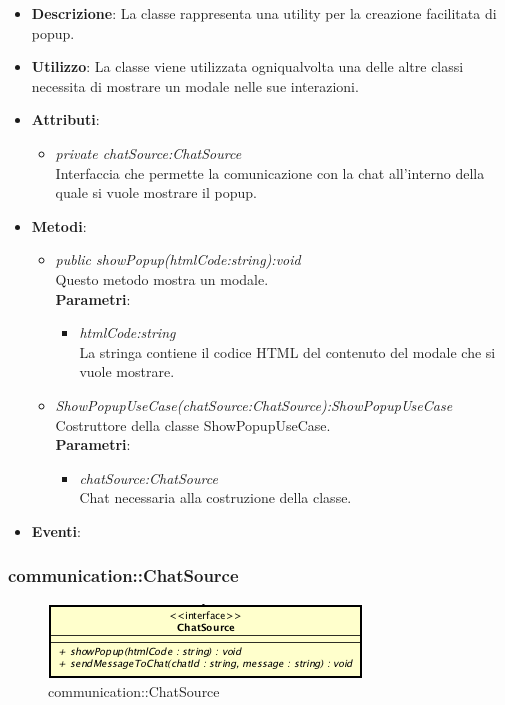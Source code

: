 \begin{itemize}
\item \textbf{Descrizione}: La classe rappresenta una utility per la creazione facilitata di popup.
\item \textbf{Utilizzo}: La classe viene utilizzata ogniqualvolta una delle altre classi necessita di mostrare un modale nelle sue interazioni.
\item \textbf{Attributi}: 
	\begin{itemize}
	\item \textit{private chatSource:ChatSource}\\
	Interfaccia che permette la comunicazione con la chat all'interno della quale si vuole mostrare il popup.
	\end{itemize}
\item \textbf{Metodi}:
	\begin{itemize}
	\item \textit{public showPopup(htmlCode:string):void}\\
	Questo metodo mostra un modale.
			\\ \textbf{Parametri}: \begin{itemize}
			\item \textit{htmlCode:string}\\
			La stringa contiene il codice HTML del contenuto del modale che si vuole mostrare.
			\end{itemize} 
	\item \textit{ShowPopupUseCase(chatSource:ChatSource):ShowPopupUseCase}\\
	Costruttore della classe ShowPopupUseCase.
		\\\textbf{Parametri}: \begin{itemize}
		\item \textit{chatSource:ChatSource}\\
		Chat necessaria alla costruzione della classe.
		\end{itemize} 
	\end{itemize}
\item \textbf{Eventi}:
\end{itemize}

\subsubsection{communication::ChatSource}

\label{communication::ChatSource}
\begin{figure}[ht]
	\centering
	\includegraphics[scale=0.5]{Sezioni/SottosezioniST/img/app/ChatSource.png}
	\caption{communication::ChatSource}
\end{figure}

